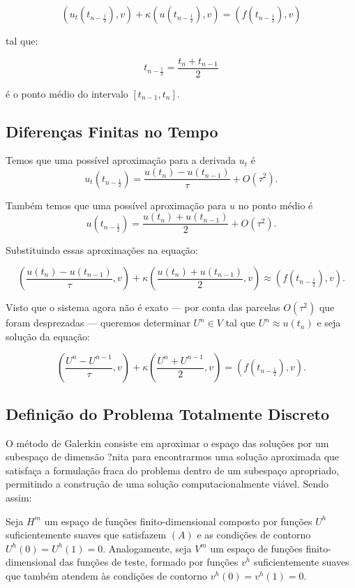   \[(u_t(t_{n - \frac{1}{2}}), v) + \kappa(u(t_{n - \frac{1}{2}}), v) = (f(t_{n - \frac{1}{2}}), v)\]

  tal que:

  \[t_{n - \frac{1}{2}} = \dfrac{t_n + t_{n-1}}{2}\]

  é o ponto médio do intervalo $[t_{n-1}, t_n]$.

\subsection{Diferenças Finitas no Tempo}

  Temos que uma possível aproximação para a derivada $u_t$ é \[u_t(t_{n - \frac{1}{2}}) = \dfrac{u(t_n) - u(t_{n-1})}{\tau} + O(\tau^2).\]

  Também temos que uma possível aproximação para $u$ no ponto médio é \[u(t_{n - \frac{1}{2}}) = \dfrac{u(t_n) + u(t_{n-1})}{2} + O(\tau^2).\]

  Substituindo essas aproximações na equação:

  \[\left(\dfrac{u(t_n) - u(t_{n-1})}{\tau}, v\right) + \kappa\left(\dfrac{u(t_n) + u(t_{n-1})}{2}, v\right) \approx (f(t_{n - \frac{1}{2}}), v).\]

  Visto que o sistema agora não é exato --- por conta das parcelas $O(\tau^2)$ que foram desprezadas --- queremos determinar $U^n \in V$ tal que $U^n \approx u(t_n)$ e seja solução da equação:

  \[\left(\dfrac{U^n - U^{n-1}}{\tau}, v\right) + \kappa\left(\dfrac{U^n + U^{n-1}}{2}, v\right) = (f(t_{n - \frac{1}{2}}), v).\]

\subsection{Definição do Problema Totalmente Discreto}

  O método de Galerkin consiste em aproximar o espaço das soluções por um subespaço de dimensão ?nita para encontrarmos uma solução aproximada que satisfaça a formulação fraca do problema dentro de um subespaço apropriado, permitindo a construção de uma solução computacionalmente viável. Sendo assim:

  Seja $H^m$ um espaço de funções finito-dimensional composto por funções $U^h$ suficientemente suaves que satisfazem $(A)$ e as condições de contorno $U^h(0) = U^h(1) = 0$. Analogamente, seja $V^m$ um espaço de funções finito-dimensional das funções de teste, formado por funções $v^h$ suficientemente suaves que também atendem às condições de contorno $v^h(0) = v^h(1) = 0$.

